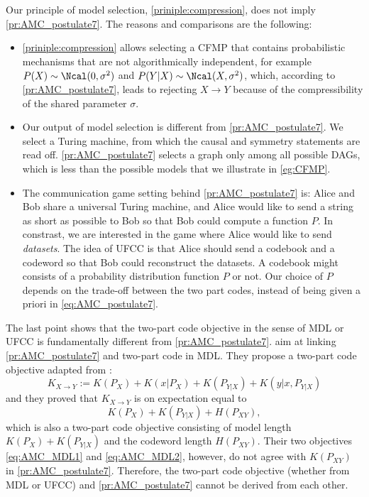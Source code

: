 Our principle of model selection, \cref{priniple:compression}, does not imply \cref{pr:AMC_postulate7}. The reasons and comparisons are the following:
\begin{itemize}
    \item \cref{priniple:compression} allows selecting a CFMP that contains probabilistic mechanisms that are not algorithmically independent, for example $P(X)\sim \Ncal(0,\sigma^2)$ and $P(Y|X)\sim \Ncal(X,\sigma^2)$, which, according to \cref{pr:AMC_postulate7}, leads to rejecting $X\to Y$ because of the compressibility of the shared parameter $\sigma$.
    \item Our output of model selection is different from \cref{pr:AMC_postulate7}. We select a Turing machine, from which the causal and symmetry statements are read off. \cref{pr:AMC_postulate7} selects a graph only among all possible DAGs, which is less than the possible models that we illustrate in \cref{eg:CFMP}.
    \item The communication game setting behind \cref{pr:AMC_postulate7} is: Alice and Bob share a universal Turing machine, and Alice would like to send a string as short as possible to Bob so that Bob could compute a function $P$. In constrast, we are interested in the game where Alice would like to send \textit{datasets}. The idea of UFCC is that Alice should send a codebook and a codeword so that Bob could reconstruct the datasets. A codebook might consists of a probability distribution function $P$ or not. Our choice of $P$ depends on the trade-off between the two part codes, instead of being given a priori in \cref{eq:AMC_postulate7}.
\end{itemize}
The last point shows that the two-part code objective in the sense of MDL or UFCC is fundamentally different from \cref{pr:AMC_postulate7}. \cite{marx2021formally} aim at linking \cref{pr:AMC_postulate7} and two-part code in MDL. They propose a two-part code objective adapted from \cite{Budhathoki}:
\begin{equation}\label{eq:AMC_MDL1}
    K_{X\to Y}:= K(P_X)+ K(x|P_X) + K(P_{Y|X}) + K(y|x, P_{Y|X})
\end{equation}
and they proved that $K_{X\to Y}$ is on expectation equal to 
\begin{equation}\label{eq:AMC_MDL2}
    K(P_X) + K(P_{Y|X}) + H(P_{XY}),
\end{equation}
which is also a two-part code objective consisting of model length $K(P_X) + K(P_{Y|X})$ and the codeword length $H(P_{XY})$. Their two objectives \cref{eq:AMC_MDL1} and \cref{eq:AMC_MDL2}, however, do not agree with $K(P_{XY})$ in \cref{pr:AMC_postulate7}. Therefore, the two-part code objective (whether from MDL or UFCC) and \cref{pr:AMC_postulate7} cannot be derived from each other.